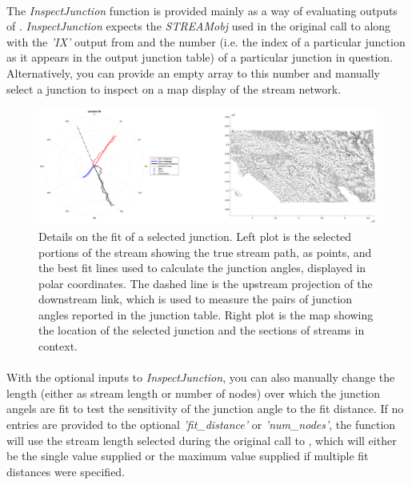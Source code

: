 \paragraph{}The \textit{InspectJunction} function is provided mainly as a way of evaluating outputs of . \textit{InspectJunction} expects the \textit{STREAMobj} used in the original call to  along with the \textit{'IX'} output from  and the number (i.e. the index of a particular junction as it appears in the output junction table) of a particular junction in question. Alternatively, you can provide an empty array to this number and manually select a junction to inspect on a map display of the stream network. 

\begin{figure}[H]
	\centering
	\includegraphics[width=16.5cm]{PNGs/InspectJunct.png}
	\caption{Details on the fit of a selected junction. Left plot is the selected portions of the stream showing the true stream path, as points, and the best fit lines used to calculate the junction angles, displayed in polar coordinates. The dashed line is the upstream projection of the downstream link, which is used to measure the pairs of junction angles reported in the junction table. Right plot is the map showing the location of the selected junction and the sections of streams in context.} 
	\label{fig:InspectJunc}
\end{figure}

\paragraph{}With the optional inputs to \textit{InspectJunction}, you can also manually change the length (either as stream length or number of nodes) over which the junction angels are fit to test the sensitivity of the junction angle to the fit distance. If no entries are provided to the optional \textit{'fit\_distance'} or \textit{'num\_nodes'}, the function will use the stream length selected during the original call to , which will either be the single value supplied or the maximum value supplied if multiple fit distances were specified.

